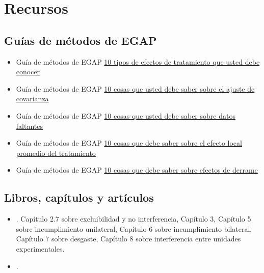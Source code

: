 \documentclass[12pt,spanish,]{book}
\begin{document}
\hypertarget{recursos-4}{%
\section{Recursos}\label{recursos-4}}

\hypertarget{guuxedas-de-muxe9todos-de-egap-3}{%
\subsection{Guías de métodos de EGAP}\label{guuxedas-de-muxe9todos-de-egap-3}}

\begin{itemize}
\item
  Guía de métodos de EGAP
  \href{https://egap.org/resource/10-types-of-treatment-effect-you-should-know-about/}{10 tipos de efectos de tratamiento que usted debe conocer}
\item
  Guía de métodos de EGAP \href{https://egap.org/resource/10-things-to-know-about-covariate-adjustment/}{10 cosas que usted debe saber sobre el ajuste de covarianza}
\item
  Guía de métodos de EGAP \href{https://egap.org/resource/10-things-to-know-about-missing-data/}{10 cosas que usted debe saber sobre datos faltantes}
\item
  Guía de métodos de EGAP \href{https://egap.org/resource/10-things-to-know-about-the-local-average-treatment-effect/}{10 cosas que debe saber sobre el efecto local promedio del tratamiento}
\item
  Guía de métodos de EGAP \href{https://egap.org/resource/10-things-to-know-about-spillovers/}{10 cosas que debe saber sobre efectos de derrame}
\end{itemize}

\hypertarget{libros-capuxedtulos-y-artuxedculos-3}{%
\subsection{Libros, capítulos y artículos}\label{libros-capuxedtulos-y-artuxedculos-3}}

\begin{itemize}
\item
  \autocite{gerber_field_2012}. Capítulo 2.7 sobre excluibilidad y no interferencia, Capítulo 3, Capítulo 5 sobre incumplimiento unilateral, Capítulo 6 sobre incumplimiento bilateral, Capítulo 7 sobre desgaste, Capítulo 8 sobre interferencia entre unidades experimentales.
\item
  \autocite{bowers2020causality}.
\end{itemize}
\end{document}
